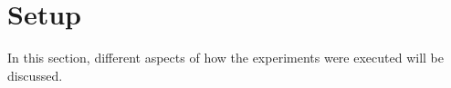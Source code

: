 \section*{Setup}

In this section, different aspects of how the experiments were executed will be discussed.